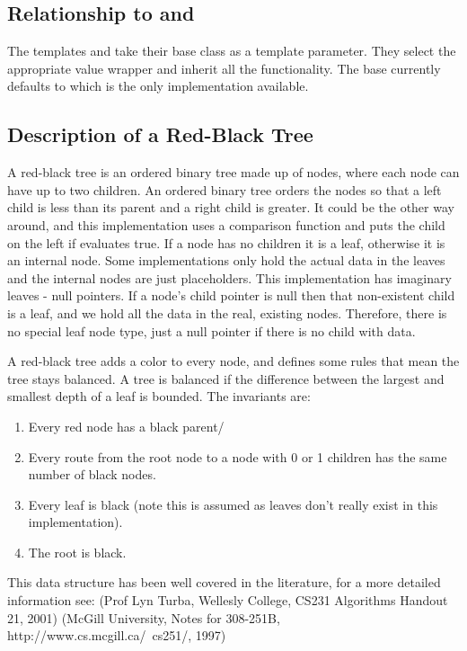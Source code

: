 \subsection{Relationship to  and }

The templates  and  take their base class as a
template parameter. They select the appropriate value wrapper and inherit all
the functionality. The base currently defaults to  which is
the only implementation available.

\subsection{Description of a Red-Black Tree}

A red-black tree is an ordered binary tree made up of nodes, where each node
can have up to two children. An ordered binary tree orders the nodes so that a
left child is less than its parent and a right child is greater. It could be
the other way around, and this implementation uses a comparison function and
puts the child on the left if  evaluates true.
If a node has no children it is a leaf, otherwise it is an internal node. Some
implementations only hold the actual data in the leaves and the internal nodes
are just placeholders. This implementation has imaginary leaves - null
pointers. If a node's child pointer is null then that non-existent child is a
leaf, and we hold all the data in the real, existing nodes. Therefore, there
is no special leaf node type, just a null pointer if there is no child with
data.

A red-black tree adds a color to every node, and defines some rules that mean
the tree stays balanced. A tree is balanced if the difference between the
largest and smallest depth of a leaf is bounded. The invariants are:

\begin{enumerate}
\item Every red node has a black parent/
\item Every route from the root node to a node with 0 or 1 children has the
same number of black nodes.
\item Every leaf is black (note this is assumed as leaves don't really exist
in this implementation).
\item The root is black.
\end{enumerate}


This data structure has been well covered in the literature, for a more
detailed information see: (Prof Lyn Turba, Wellesly College, CS231 Algorithms
Handout 21, 2001) (McGill University, Notes for 308-251B,
http://www.cs.mcgill.ca/~cs251/, 1997) 


